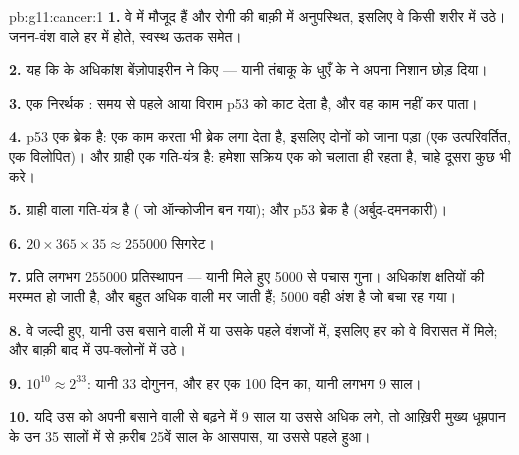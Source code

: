 \begin{solution}{pb:g11:cancer:1}
\textbf{1.} वे  में मौजूद हैं और रोगी की बाक़ी  में
अनुपस्थित, इसलिए वे किसी शरीर  में उठे। जनन-वंश वाले  हर
 में होते, स्वस्थ ऊतक समेत।

\textbf{2.} यह कि  के अधिकांश  बेंज़ोपाइरीन ने किए ---
यानी तंबाकू के धुएँ के  ने अपना निशान छोड़ दिया।

\textbf{3.} एक निरर्थक : समय से पहले आया विराम  p53 को
काट देता है, और वह काम नहीं कर पाता।

\textbf{4.} p53 एक ब्रेक है: एक काम करता  भी ब्रेक लगा देता है,
इसलिए दोनों को जाना पड़ा (एक उत्परिवर्तित, एक विलोपित)। और ग्राही एक
गति-यंत्र है: हमेशा सक्रिय एक   को चलाता ही रहता है, चाहे
दूसरा  कुछ भी करे।

\textbf{5.} ग्राही वाला  गति-यंत्र है ( जो ऑन्कोजीन बन
गया); और p53 ब्रेक है (अर्बुद-दमनकारी)।

\textbf{6.} $20 \times 365 \times 35 \approx \num{255000}$ सिगरेट।

\textbf{7.} प्रति  लगभग $\num{255000}$ प्रतिस्थापन --- यानी मिले
हुए 5000 से पचास गुना। अधिकांश क्षतियों की मरम्मत हो जाती है, और बहुत अधिक
 वाली  मर जाती हैं; 5000 वही अंश है जो बचा रह गया।

\textbf{8.} वे जल्दी हुए, यानी उस बसाने वाली  में या उसके पहले
वंशजों में, इसलिए हर   को वे विरासत में मिले; और बाक़ी बाद में
उप-क्लोनों में उठे।

\textbf{9.} $10^{10} \approx 2^{33}$: यानी 33 दोगुनन, और हर एक 100 दिन
का, यानी लगभग 9 साल।

\textbf{10.} यदि उस  को अपनी बसाने वाली  से बढ़ने में 9 साल या
उससे अधिक लगे, तो आख़िरी मुख्य  धूम्रपान के उन 35 सालों में से
क़रीब 25वें साल के आसपास, या उससे पहले हुआ।


\end{solution}
